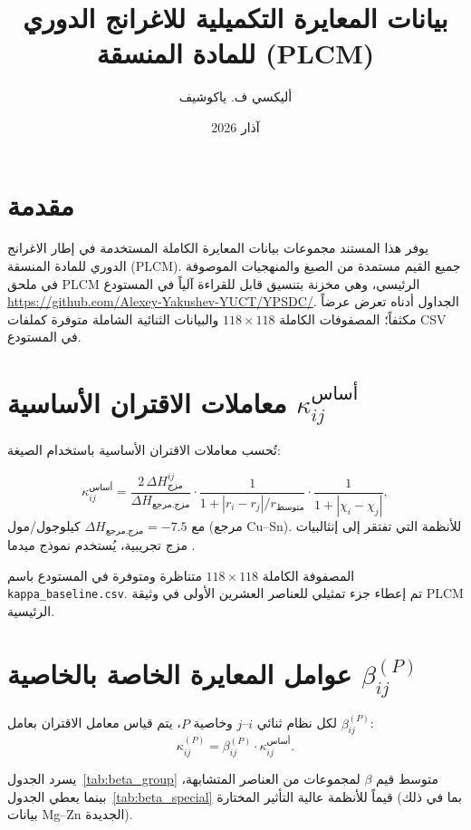 \documentclass[12pt,a4paper]{article}
\title{بيانات المعايرة التكميلية للاغرانج الدوري للمادة المنسقة (PLCM)}
\author{أليكسي ف. ياكوشيف}
\date{آذار 2026}
\begin{document}
	\maketitle
	
	\tableofcontents
	\newpage
	
	\section{مقدمة}
	يوفر هذا المستند مجموعات بيانات المعايرة الكاملة المستخدمة في إطار الاغرانج الدوري للمادة المنسقة (PLCM). جميع القيم مستمدة من الصيغ والمنهجيات الموصوفة في ملحق PLCM الرئيسي، وهي مخزنة بتنسيق قابل للقراءة آلياً في المستودع \url{https://github.com/Alexey-Yakushev-YUCT/YPSDC/}. الجداول أدناه تعرض عرضاً مكثفاً؛ المصفوفات الكاملة \(118\times118\) والبيانات الثنائية الشاملة متوفرة كملفات CSV في المستودع.
	
	\section{معاملات الاقتران الأساسية \(\kappa_{ij}^{\text{أساس}}\)}
	تُحسب معاملات الاقتران الأساسية باستخدام الصيغة:
	
	\[
	\kappa_{ij}^{\text{أساس}} = \frac{2\,\Delta H_{\text{مزج}}^{ij}}{\Delta H_{\text{مزج,مرجع}}} \cdot
	\frac{1}{1 + |r_i - r_j|/r_{\text{متوسط}}} \cdot
	\frac{1}{1 + |\chi_i - \chi_j|},
	\]
	مع \(\Delta H_{\text{مزج,مرجع}} = -7.5\) كيلوجول/مول (مرجع Cu–Sn). للأنظمة التي تفتقر إلى إنثالبيات مزج تجريبية، يُستخدم نموذج ميدما \cite{Miedema1980}.
	
	المصفوفة الكاملة \(118\times118\) متناظرة ومتوفرة في المستودع باسم \texttt{kappa\_baseline.csv}. تم إعطاء جزء تمثيلي للعناصر العشرين الأولى في وثيقة PLCM الرئيسية.
	
	\section{عوامل المعايرة الخاصة بالخاصية \(\beta_{ij}^{(P)}\)}
	لكل نظام ثنائي \(i\)–\(j\) وخاصية \(P\)، يتم قياس معامل الاقتران بعامل \(\beta_{ij}^{(P)}\):
	\[
	\kappa_{ij}^{(P)} = \beta_{ij}^{(P)} \cdot \kappa_{ij}^{\text{أساس}}.
	\]
	
	يسرد الجدول~\ref{tab:beta_group} متوسط قيم \(\beta\) لمجموعات من العناصر المتشابهة، بينما يعطي الجدول~\ref{tab:beta_special} قيماً للأنظمة عالية التأثير المختارة (بما في ذلك بيانات Mg–Zn الجديدة).
	
\end{document}
